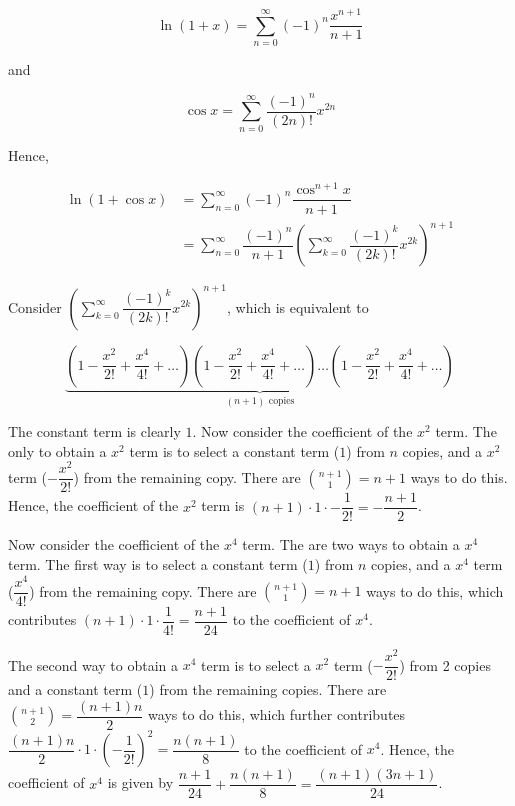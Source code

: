 \documentclass{jhwhw}
\begin{document}
        \begin{equation*}
            \ln (1 + x) = \sum_{n=0}^\infty (-1)^n \dfrac{x^{n+1}}{n+1}
        \end{equation*}

        and 

        \begin{equation*}
            \cos x = \sum_{n=0}^\infty \dfrac{(-1)^n}{(2n)!} x^{2n}
        \end{equation*}

        Hence,

        \begin{align*}
            \ln (1 + \cos x) &= \sum_{n=0}^\infty (-1)^n \dfrac{\cos^{n+1} x}{n+1}\\
            &= \sum_{n=0}^\infty \dfrac{(-1)^n}{n+1} \left(\sum_{k=0}^\infty \dfrac{(-1)^k}{(2k)!} x^{2k} \right)^{n+1}
        \end{align*}

        Consider $\left(\sum_{k=0}^\infty \dfrac{(-1)^k}{(2k)!} x^{2k} \right)^{n+1}$, which is equivalent to

        \begin{equation*}
            \underbrace{\left(1 - \dfrac{x^2}{2!} + \dfrac{x^4}{4!} + \ldots \right)\left(1 - \dfrac{x^2}{2!} + \dfrac{x^4}{4!} + \ldots \right)\ldots\left(1 - \dfrac{x^2}{2!} + \dfrac{x^4}{4!} + \ldots \right)}_\text{$(n + 1)$ copies}
        \end{equation*}

        The constant term is clearly $1$. Now consider the coefficient of the $x^2$ term. The only to obtain a $x^2$ term is to select a constant term ($1$) from $n$ copies, and a $x^2$ term ($-\dfrac{x^2}{2!}$) from the remaining copy. There are $\displaystyle\binom{n+1}{1} = n+1$ ways to do this. Hence, the coefficient of the $x^2$ term is $(n+1) \cdot 1 \cdot -\dfrac{1}{2!} = -\dfrac{n+1}2$.

        Now consider the coefficient of the $x^4$ term. The are two ways to obtain a $x^4$ term. The first way is to select a constant term ($1$) from $n$ copies, and a $x^4$ term ($\dfrac{x^4}{4!}$) from the remaining copy. There are $\displaystyle\binom{n+1}1 = n+1$ ways to do this, which contributes $(n+1) \cdot 1 \cdot \dfrac{1}{4!} = \dfrac{n+1}{24}$ to the coefficient of $x^4$.

        The second way to obtain a $x^4$ term is to select a $x^2$ term ($-\dfrac{x^2}{2!}$) from 2 copies and a constant term ($1$) from the remaining copies. There are $\displaystyle \binom{n+1}{2} = \dfrac{(n+1)n}2$ ways to do this, which further contributes $\dfrac{(n+1)n}2 \cdot 1 \cdot \left(-\dfrac{1}{2!}\right)^2 = \dfrac{n(n+1)}8$ to the coefficient of $x^4$. Hence, the coefficient of $x^4$ is given by $\dfrac{n+1}{24} + \dfrac{n(n+1)}8 = \dfrac{(n+1)(3n + 1)}{24}$. 
\end{document}
